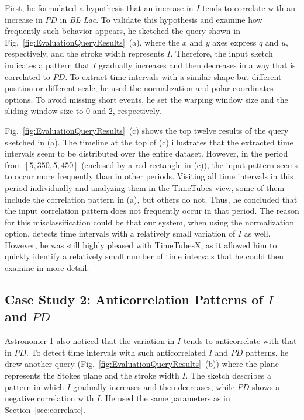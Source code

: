 First, he formulated a hypothesis that an increase in $I$ tends to correlate with an increase in $PD$ in \emph{BL Lac}.
To validate this hypothesis and examine how frequently such behavior appears, he sketched the query shown in Fig.~\ref{fig:EvaluationQueryResults}~(a), 
where the $x$ and $y$ axes express $q$ and $u$, respectively, 
and the stroke width represents $I$.
Therefore, the input sketch indicates a pattern 
that $I$ gradually increases and then decreases in a way that is correlated to $PD$.
To extract time intervals with a similar shape but different position or different scale, he used the normalization and polar coordinates options. 
To avoid missing short events, he set the warping window size and the sliding window size to 0 and 2, respectively.

Fig.~\ref{fig:EvaluationQueryResults}~(c) shows the top twelve results of the query sketched in (a).
The timeline at the top of (c) illustrates 
that the extracted time intervals seem to be distributed over the entire dataset.
However, in the period from $[5{,}350, 5{,}450]$ (enclosed by a red rectangle in (c)), 
the input pattern seems to occur more frequently than in other periods.
Visiting all time intervals in this period individually and analyzing them in the TimeTubes view,
some of them include the correlation pattern in (a),
but others do not.
Thus, he concluded that the input correlation pattern does not frequently occur in that period.
The reason for this misclassification could be that our system, when using the normalization option, detects time intervals with a relatively small variation of $I$ as well.
However, he was still highly pleased with TimeTubesX, as it allowed him to quickly identify a relatively small number of time intervals that he could then examine in more detail.

%
\subsection{Case Study 2: Anticorrelation Patterns of $I$ and $PD$}\label{sec:anticorrelate}
Astronomer 1 also noticed that the variation in $I$ tends to anticorrelate with that in $PD$. %
To detect time intervals with such anticorrelated $I$ and $PD$ patterns, he drew another query (Fig.~\ref{fig:EvaluationQueryResults}~(b))
where the plane represents the Stokes plane and the stroke width $I$.
The sketch describes a pattern in which $I$ gradually increases and then decreases, while $PD$ shows a negative correlation with $I$. %
He used the same parameters as in Section~\ref{sec:correlate}.

